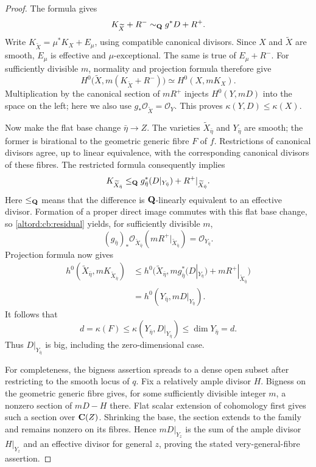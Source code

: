 \begin{proof}
The formula gives
\[
 K_{\widetilde X}+R^-
 \sim_{\mathbf Q}g^*D+R^+.
\]
Write \(K_{\widetilde X}=\mu^*K_X+E_\mu\), using compatible
canonical divisors.  Since \(X\) and \(\widetilde X\) are smooth,
\(E_\mu\) is effective and \(\mu\)-exceptional.
The same is true of \(E_\mu+R^-\).
For sufficiently divisible \(m\), normality and projection
formula therefore give
\[
 H^0\bigl(\widetilde X,m(K_{\widetilde X}+R^-)\bigr)
 \simeq H^0(X,mK_X).
\]
Multiplication by the canonical section of \(mR^+\) injects
\(H^0(Y,mD)\) into the space on the left; here we also use
\(g_*\mathcal O_{\widetilde X}=\mathcal O_Y\).
This proves \(\kappa(Y,D)\leq\kappa(X)\).

Now make the flat base change \(\bar\eta\to Z\).
The varieties \(\widetilde X_{\bar\eta}\) and \(Y_{\bar\eta}\)
are smooth; the former is birational to the geometric generic
fibre \(F\) of \(f\).
Restrictions of canonical divisors agree, up to linear
equivalence, with the corresponding canonical divisors of these
fibres.  The restricted formula consequently implies
\[
 K_{\widetilde X_{\bar\eta}}
 \leq_{\mathbf Q}
 g_{\bar\eta}^*(D|_{Y_{\bar\eta}})
 +R^+|_{\widetilde X_{\bar\eta}}.
\]
Here \(\leq_{\mathbf Q}\) means that the difference is
\(\mathbf Q\)-linearly equivalent to an effective divisor.
Formation of a proper direct image commutes with this flat
base change, so \eqref{altord:cb:residual} yields, for sufficiently
divisible \(m\),
\[
 (g_{\bar\eta})_*
 \mathcal O_{\widetilde X_{\bar\eta}}
       (mR^+|_{\widetilde X_{\bar\eta}})
 =\mathcal O_{Y_{\bar\eta}}.
\]
Projection formula now gives
\begin{align*}
 h^0(\widetilde X_{\bar\eta},mK_{\widetilde X_{\bar\eta}})
 &\leq
 h^0\bigl(\widetilde X_{\bar\eta},
 m g_{\bar\eta}^*(D|_{Y_{\bar\eta}})
       +mR^+|_{\widetilde X_{\bar\eta}}\bigr)\\
 &=h^0(Y_{\bar\eta},mD|_{Y_{\bar\eta}}).
\end{align*}
It follows that
\[
 d=\kappa(F)
 \leq\kappa(Y_{\bar\eta},D|_{Y_{\bar\eta}})
 \leq\dim Y_{\bar\eta}=d.
\]
Thus \(D|_{Y_{\bar\eta}}\) is big, including the
zero-dimensional case.

For completeness, the bigness assertion spreads to a dense open
subset after restricting to the smooth locus of \(q\).
Fix a relatively ample divisor \(H\).
Bigness on the geometric generic fibre gives, for some
sufficiently divisible integer \(m\),
a nonzero section of \(mD-H\) there.  Flat scalar extension of
cohomology first gives such a section over \(\mathbf C(Z)\).
Shrinking the base, the section extends to the family and remains
nonzero on its fibres.  Hence \(mD|_{Y_z}\) is the sum of the
ample divisor \(H|_{Y_z}\) and an effective divisor for general
\(z\), proving the stated very-general-fibre assertion.
\end{proof}

